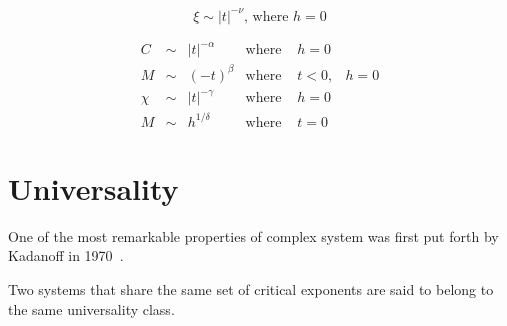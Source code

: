 \begin{equation}
    \xi\sim\left|t\right|^{-\nu}\mbox{, where }h=0
\end{equation}

\begin{equation}
    \begin{array}{cccccc}
        C & \sim & \left|t\right|^{-\alpha} & \mbox{where } & h=0\\
        M & \sim & {\left(-t\right)}^{\beta} & \mbox{where } & t<0, & h=0\\
        \chi & \sim & \left|t\right|^{-\gamma} & \mbox{where } & h=0\\
        M & \sim & h^{1/\delta} & \mbox{where } & t=0
    \end{array}
\end{equation}

\section{Universality}
\label{sec:universality}

One of the most remarkable properties of complex system was first put forth by
Kadanoff in 1970~\cite{Kadanoff1971}.

Two systems that share the same set of critical exponents are said to belong to
the same universality class.
